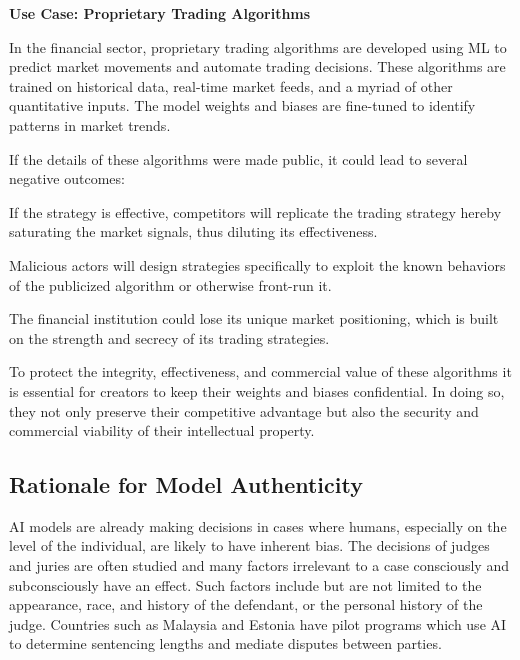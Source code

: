 \documentclass[conference]{IEEEtran}
\begin{document}
\textbf{Use Case: Proprietary Trading Algorithms}

In the financial sector, proprietary trading algorithms are developed using ML to predict market movements and automate trading decisions. These algorithms are trained on historical data, real-time market feeds, and a myriad of other quantitative inputs. The model weights and biases are fine-tuned to identify patterns in market trends.

If the details of these algorithms were made public, it could lead to several negative outcomes:

If the strategy is effective, competitors will replicate the trading strategy hereby saturating the market signals, thus diluting its effectiveness.

Malicious actors will design strategies specifically to exploit the known behaviors of the publicized algorithm or otherwise front-run it.

The financial institution could lose its unique market positioning, which is built on the strength and secrecy of its trading strategies.

To protect the integrity, effectiveness, and commercial value of these algorithms it is essential for creators to keep their weights and biases confidential. In doing so, they not only preserve their competitive advantage but also the security and commercial viability of their intellectual property.
\subsection{Rationale for Model Authenticity}
AI models are already making decisions in cases where humans, especially on the level of the individual, are likely to have inherent bias. The decisions of judges and juries are often studied and many factors irrelevant to a case consciously and subconsciously have an effect. Such factors include but are not limited to the appearance, race, and history of the defendant, or the personal history of the judge. Countries such as Malaysia and Estonia have pilot programs which use AI to determine sentencing lengths and mediate disputes between parties.   
\end{document}
